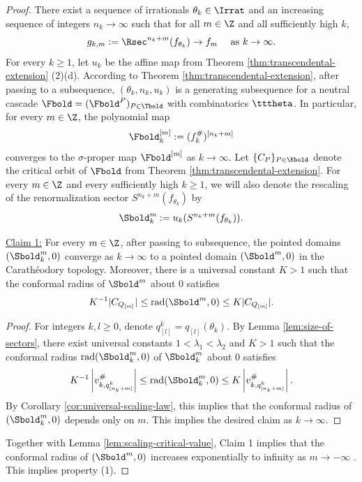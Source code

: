 \documentclass{amsart}
\begin{document}
\begin{proof}
    There exist a sequence of irrationals $\theta_k \in \Irrat$ and an increasing sequence of integers $n_k \to \infty$ such that for all $m \in \Z$ and all sufficiently high $k$,
    \[
    g_{k,m} := \Rsec^{n_k+m}(f_{\theta_k}) \to f_m 
    \quad \text{ as } k \to \infty.
    \]
    For every $k \geq 1$, let $u_k$ be the affine map from Theorem \ref{thm:transcendental-extension} (2)(d). 
    According to Theorem \ref{thm:transcendental-extension}, after passing to a subsequence, $(\theta_k, n_k, u_k)$ is a generating subsequence for a neutral cascade $\Fbold = (\Fbold^P)_{P \in \Tbold}$ with combinatorics $\tttheta$.
    In particular,
    for every $m \in \Z$, the polynomial map
    \[
        \Fbold_{k}^{[m]} := (f_k^{\#})^{[n_k+m]}
    \]
    converges to the $\sigma$-proper map $\Fbold^{[m]}$ as $k \to \infty$.
    Let $\{C_P\}_{P \in \Kbold}$ denote the critical orbit of $\Fbold$ from Theorem \ref{thm:transcendental-extension}.
    For every $m \in \Z$ and every sufficiently high $k \geq 1$, we will also denote the rescaling of the renormalization sector $S^{n_k+m}(f_{\theta_k})$ by
    \[
        \Sbold_k^m := u_k(S^{n_k+m}(f_{\theta_k})).
    \]

    \noindent \underline{Claim 1:} 
    For every $m \in \Z$, after passing to subsequence, the pointed domains $(\Sbold_k^m,0)$ converge as $k \to \infty$ to a pointed domain $(\Sbold^m,0)$ in the Carath\'eodory topology.
    Moreover, there is a universal constant $K>1$ such that the conformal radius of $\Sbold^m$ about $0$ satisfies
    \[
        K^{-1} |C_{Q_{[m]}}| \leq \text{rad}(\Sbold^m,0) \leq K |C_{Q_{[m]}}|.
    \]
    
    \begin{proof}
        For integers $k, l \geq 0$, denote $q^k_{[l]} = q_{[l]}(\theta_k)$. 
        By Lemma \ref{lem:size-of-sectors}, there exist universal constants $1< \lambda_1 <\lambda_2$ and $K > 1$ such that the conformal radius $\textnormal{rad}(\Sbold_k^m,0)$ of $\Sbold_k^m$ about $0$ satisfies
    \[
        K^{-1} 
        \left| v_{k, q^k_{[n_k+m]}}^{\#} \right|
        \leq \textnormal{rad}(\Sbold_k^m,0) \leq 
        K \left| v_{k, q^k_{[n_k+m]}}^{\#} \right|.
    \]
        By Corollary \ref{cor:universal-scaling-law}, this implies that the conformal radius of $(\Sbold_k^m,0)$ depends only on $m$.
        This implies the desired claim as $k \to \infty$.
    \end{proof}
    
    Together with Lemma \ref{lem:scaling-critical-value}, Claim 1 implies that the conformal radius of $(\Sbold^m,0)$ increases exponentially to infinity as $m \to -\infty$ . This implies property (1).
    

\end{proof}
\end{document}
